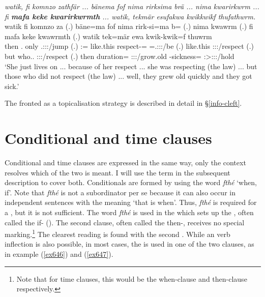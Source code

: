 \begin{exe}
	\ex \emph{watik, fi komnzo zathfär ... bänema fof nima rirksima brä ... nima kwarirkwrm ... fi \textbf{mafa keke kwarirkwrmth} ... watik, tekmär esufakwa kwikkwikf thufathwrm.}\\
	\gll watik fi komnzo za (.) bäne=ma fof nima rirk-si=ma b= (.) nima kwawrm (.) fi mafa keke kwawrmth (.) watik tek=mär ewa kwik-kwik=f thuwrm\\
	then \Third.{\Abs} only \Tsg.\F:\Sbj:\Rpst:\Pfv/jump (.) \Dem:\Med={\Char} {\Emph} {like.this} respect-\Nmlz={\Char} \Med=\Tsg.\F:\Sbj:\Nonpast:\Ipfv/be (.) {like.this} \Stsg:\Sbj:\Pst:\Dur/respect (.) but who.\Nsg.{\Erg} {\Neg} \Stpl:\Sbj:\Pst:\Dur/respect (.) then duration={\Priv} \Stpl:\Sbj:\Pst:\Ipfv/grow.old \Redup-sickness={\Erg} \Stsg:\Sbj>\Stpl:\Obj:\Pst:\Dur/hold\\
	\trans `She just lives on ... because of her respect ... she was respecting (the law) ... but those who did not respect (the law) ... well, they grew old quickly and they got sick.'
	\label{ex555}
\end{exe}

The fronted  as a topicalisation strategy is described in detail in {\S}\ref{info-cleft}.

\section{Conditional and time clauses}\label{condiclauses}

Conditional and time clauses are expressed in the same way, only the context resolves which of the two is meant. I will use the term  in the subsequent description to cover both. Conditionals are formed by using the word \emph{fthé} `when, if'. Note that \emph{fthé} is not a subordinator per se because it can also occur in independent sentences with the meaning `that is when'. Thus, \emph{fthé} is required for a , but it is not sufficient. The word \emph{fthé} is used in the  which sets up the , often called the if- (\citealt[255]{Thompson:2007relclauses}). The second clause, often called the then-, receives no special marking.\footnote{Note that for time clauses, this would be the when-clause and then-clause respectively.} The clearest  reading is found with the second . While an  verb inflection is also possible, in most cases, the  is used in one of the two clauses, as in example (\ref{ex646}) and (\ref{ex647}).

